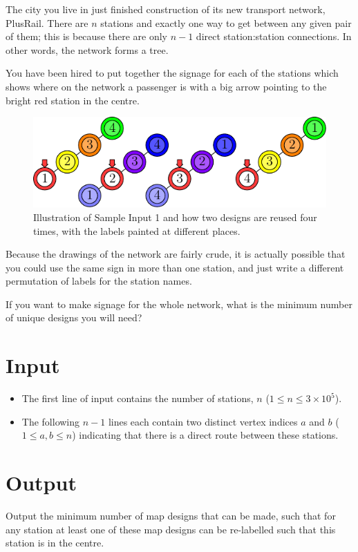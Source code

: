 
The city you live in just finished construction of its new transport network,
PlusRail. There are $n$ stations and exactly one way to get between any given
pair of them; this is because there are only $n-1$ direct station:station
connections. In other words, the network forms a tree.

You have been hired to put together the signage for each of the stations which
shows where on the network a passenger is with a big arrow pointing to the
bright red station in the centre.

\begin{figure}[h!]
  \centering
  \includegraphics[width=1.0\textwidth]{sample}
  \caption{Illustration of Sample Input 1 and how two designs are reused four
           times, with the labels painted at different places.}
  \label{fig:grandcentral}
\end{figure}

Because the drawings of the network are fairly crude, it is actually possible
that you could use the same sign in more than one station, and just write a
different permutation of labels for the station names.

If you want to make signage for the whole network, what is the minimum number
of unique designs you will need?

\section*{Input}
\begin{itemize}
\item The first line of input contains the number of stations, $n$
      ($1 \le n \le 3 \times 10^5$).

\item The following $n-1$ lines each contain two distinct vertex indices
      $a$ and $b$ ($1 \le a, b \le n$) indicating that there is a direct
      route between these stations.
\end{itemize}

\section*{Output}

Output the minimum number of map designs that can be made, such that for any
station at least one of these map designs can be re-labelled such that this
station is in the centre.
